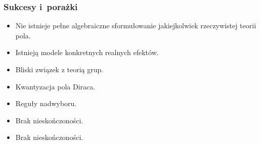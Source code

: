 \documentclass[10pt,t]{beamer}
\begin{document}
\begin{frame}
  \frametitle{Sukcesy i~porażki}


  \begin{itemize}
    \RaggedRight

  \item Nie istnieje pełne algebraiczne sformułowanie jakiejkolwiek
    rzeczywistej teorii pola.

  \item Istnieją modele konkretnych realnych efektów.

  \item Bliski związek z teorią grup.

  \item Kwantyzacja pola Diraca.

  \item Reguły nadwyboru.

  \item Brak nieskończoności.

  \item Brak nieskończoności.

  \end{itemize}

\end{frame}












{}






\end{document}
